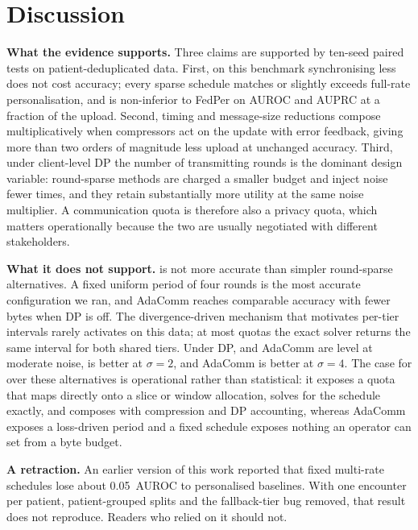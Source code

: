 \section{Discussion}
\label{sec:discussion}

\textbf{What the evidence supports.} Three claims are supported by ten-seed paired tests on patient-deduplicated data. First, on this benchmark synchronising less does not cost accuracy; every sparse schedule matches or slightly exceeds full-rate personalisation, and \tierfed{} is non-inferior to FedPer on AUROC and AUPRC at a fraction of the upload. Second, timing and message-size reductions compose multiplicatively when compressors act on the update with error feedback, giving more than two orders of magnitude less upload at unchanged accuracy. Third, under client-level DP the number of transmitting rounds is the dominant design variable: round-sparse methods are charged a smaller budget and inject noise fewer times, and they retain substantially more utility at the same noise multiplier. A communication quota is therefore also a privacy quota, which matters operationally because the two are usually negotiated with different stakeholders.

\textbf{What it does not support.} \tierfed{} is not more accurate than simpler round-sparse alternatives. A fixed uniform period of four rounds is the most accurate configuration we ran, and AdaComm reaches comparable accuracy with fewer bytes when DP is off. The divergence-driven mechanism that motivates per-tier intervals rarely activates on this data; at most quotas the exact solver returns the same interval for both shared tiers. Under DP, \tierfed{} and AdaComm are level at moderate noise, \tierfed{} is better at $\sigma=2$, and AdaComm is better at $\sigma=4$. The case for \tierfed{} over these alternatives is operational rather than statistical: it exposes a quota that maps directly onto a slice or window allocation, solves for the schedule exactly, and composes with compression and DP accounting, whereas AdaComm exposes a loss-driven period and a fixed schedule exposes nothing an operator can set from a byte budget.

\textbf{A retraction.} An earlier version of this work reported that fixed multi-rate schedules lose about 0.05~AUROC to personalised baselines. With one encounter per patient, patient-grouped splits and the fallback-tier bug removed, that result does not reproduce. Readers who relied on it should not.

